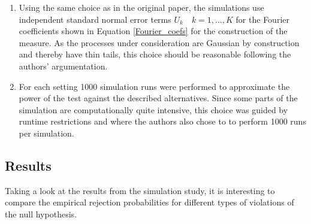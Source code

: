 \documentclass[12pt, a4paper]{article}
\theoremstyle{MAstyle} \newtheorem{assumption}{Assumption}[section]
\theoremstyle{MAstyle} \newtheorem{definition}{Definition}[section]
\theoremstyle{MAstyle} \newtheorem{theorem}{Theorem}[section]
\begin{document}
{{\begin{enumerate}
			\item Using the same choice as in the original paper, the simulations use independent standard normal error terms $U_k \quad k=1, \dots, K$ for the Fourier coefficients shown in Equation \ref{Fourier_coefs} for the construction of the measure. As the processes under consideration are Gaussian by construction and thereby have thin tails, this choice should be reasonable following the authors' argumentation.
			\item For each setting 1000 simulation runs were performed to approximate the power of the test against the described alternatives. Since some parts of the simulation are computationally quite intensive, this choice was guided by runtime restrictions and \cite{bugni_permutation_2021} where the authors also chose to to perform 1000 runs per simulation.
		\end{enumerate}
					}
	}
		\subsection{Results}
		Taking a look at the results from the simulation study, it is interesting to compare the empirical rejection probabilities for different types of violations of the null hypothesis.
		
\end{document}
